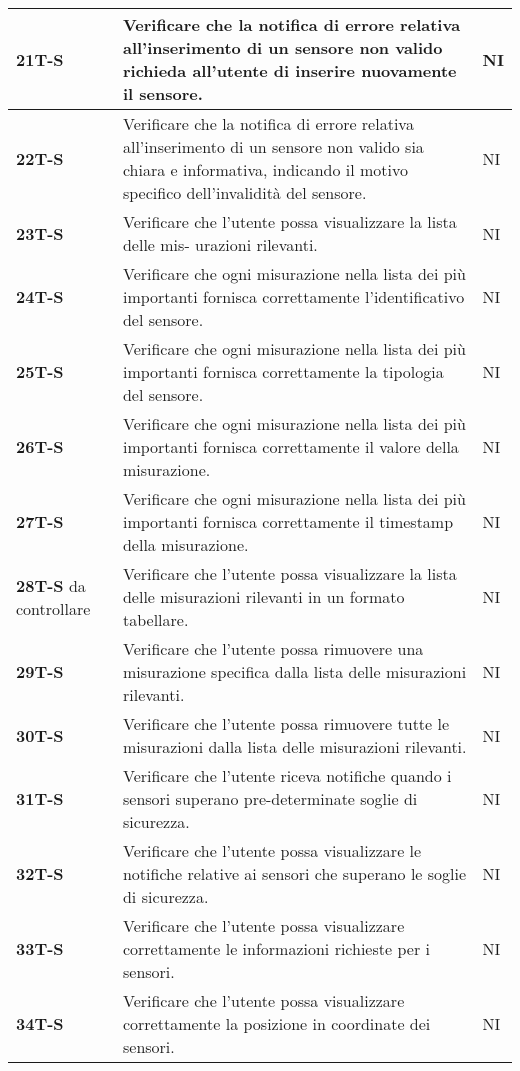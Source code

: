 \begin{longtable}{|>{\raggedright\arraybackslash}m{}|>{\raggedright\arraybackslash}m{}|>{\raggedright\arraybackslash}m{}|}
	\hline
	\textbf{21T-S}   & Verificare che la notifica di errore relativa all’inserimento di un sensore non valido richieda all’utente di inserire nuovamente il sensore. & NI\\
	\hline
	\textbf{22T-S}   & Verificare che la notifica di errore relativa all’inserimento di un sensore non valido sia chiara e informativa, indicando il motivo specifico dell’invalidità del sensore. & NI\\
	\hline
	\textbf{23T-S}   & Verificare che l’utente possa visualizzare la lista delle mis- urazioni rilevanti. & NI\\
	\hline
	\textbf{24T-S}   & Verificare che ogni misurazione nella lista dei più importanti fornisca correttamente l’identificativo del sensore. & NI\\
	\hline
	\textbf{25T-S}   & Verificare che ogni misurazione nella lista dei più importanti fornisca correttamente la tipologia del sensore. & NI\\
	\hline
	\textbf{26T-S}   & Verificare che ogni misurazione nella lista dei più importanti fornisca correttamente il valore della misurazione. & NI\\
	\hline
	\textbf{27T-S}   & Verificare che ogni misurazione nella lista dei più importanti fornisca correttamente il timestamp della misurazione. & NI\\
	\hline
	\textbf{28T-S} da controllare  & Verificare che l’utente possa visualizzare la lista delle misurazioni rilevanti in un formato tabellare. & NI\\
	\hline
	\textbf{29T-S}   & Verificare che l’utente possa rimuovere una misurazione specifica dalla lista delle misurazioni rilevanti. & NI\\
	\hline
	\textbf{30T-S}   & Verificare che l’utente possa rimuovere tutte le misurazioni dalla lista delle misurazioni rilevanti. & NI\\
	\hline
	\textbf{31T-S}   & Verificare che l’utente riceva notifiche quando i sensori superano pre-determinate soglie di sicurezza. & NI\\
	\hline
	\textbf{32T-S}   & Verificare che l’utente possa visualizzare le notifiche relative ai sensori che superano le soglie di sicurezza. & NI\\
	\hline
	\textbf{33T-S}   & Verificare che l’utente possa visualizzare correttamente le informazioni richieste per i sensori. & NI\\
	\hline
	\textbf{34T-S}   & Verificare che l’utente possa visualizzare correttamente la posizione in coordinate dei sensori. & NI\\

\end{longtable}
